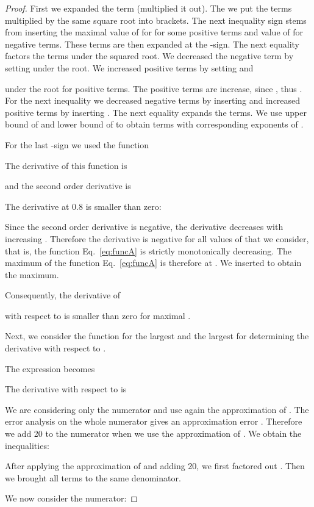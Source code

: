 \documentclass{article}
\begin{document}
\begin{proof}
First we expanded the term (multiplied it out).
The we put the terms multiplied by the same square root into brackets.
The next inequality sign stems from inserting the maximal value of  for  for
some positive terms and value of  for negative terms. 
These terms are then expanded at the -sign.
The next equality factors the terms under the squared root.
We decreased the negative term by setting
 under the root.
We increased positive terms by setting  
 and

under the root for positive terms.
The positive terms are increase, since
, thus
.
For the next inequality we decreased negative terms by inserting
 and increased positive terms by inserting
. The next equality expands the terms.
We use upper bound of  and lower bound of  to obtain terms with
corresponding exponents of .

For the last -sign we used the function

The derivative of this function is

and the second order derivative is

The derivative at 0.8 is smaller than zero:

Since the second order derivative is negative, the derivative
decreases with increasing . Therefore the derivative is
negative for all values of   that we consider, that is, the
function Eq.~\eqref{eq:funcA} is strictly monotonically decreasing.
The maximum of the function Eq.~\eqref{eq:funcA} is therefore at .
We inserted  to obtain the maximum.



Consequently, the derivative of

with respect to  is smaller than zero for maximal .

Next,
we consider the function for  
the largest  and the largest  
for determining the derivative with respect to . 


The expression becomes


The derivative with respect to  is 


We are considering only the numerator and use again the approximation
of \citet{Ren:07}.
The error analysis on the whole numerator gives an approximation error . Therefore
we add 20 to the numerator when we use the approximation of \citet{Ren:07}.
We obtain the inequalities:

After applying the approximation
of \citet{Ren:07} and adding 20,
we first factored out .
Then we brought all terms to the same denominator.

We now consider the numerator:



\end{proof}
\end{document}
